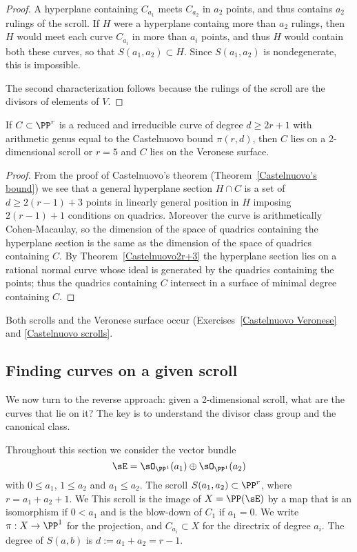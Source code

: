 \begin{proof}
A hyperplane containing $C_{a_1}$ meets $C_{a_2}$ in $a_2$
points, and thus contains $a_2$ rulings of the scroll. If $H$ were a hyperplane containg more than $a_2$
rulings, then $H$ would meet each curve $C_{a_i}$ in more than $a_i$ points, and thus $H$ would contain
both these curves, so that $S(a_1,a_2)\subset H$. Since $S(a_1,a_2)$ is nondegenerate, this is impossible.

The second characterization follows because the rulings of the scroll are the divisors of elements of $V.$
\end{proof}



\begin{theorem}\label{Castelnuovo examples}
If $C\subset \PP^r$ is a reduced and irreducible curve of degree $d\geq 2r+1$ with arithmetic genus equal to
the
Castelnuovo bound $\pi(r,d)$, then $C$ lies on a 2-dimensional scroll or $r=5$ and $C$ lies on  the Veronese surface.
\end{theorem}

\begin{proof}
From the proof of Castelnuovo's theorem (Theorem~\ref{Castelnuovo's bound}) we see that a general hyperplane
section $H\cap C$ is a set of $d\geq 2(r-1)+3$ points in linearly general position in $H$ imposing $2(r-1)+1$ conditions on quadrics. Moreover the curve
is arithmetically Cohen-Macaulay, so the dimension of the space of quadrics containing the hyperplane section
is the same as the dimension of the space of quadrics containing $C$. By Theorem~\ref{Castelnuovo2r+3} the hyperplane
section lies on a rational normal curve whose ideal is generated by the quadrics containing the points;
thus the quadrics containing $C$ intersect in a surface of minimal degree containing $C$.
\end{proof}

Both scrolls and the Veronese surface occur (Exercises~\ref{Castelnuovo Veronese} and \ref{Castelnuovo scrolls}.

\subsection{Finding curves on a given scroll}

We now turn to the reverse approach: given a 2-dimensional scroll, what are the curves that lie on it?
The key is to understand the divisor class group and the canonical class.

 Throughout this section we consider the vector bundle 
$$
\sE = \sO_{\PP^1}(a_1) \oplus\sO_{\PP^1}(a_2)
$$
with  $0\leq a_1$, $1\leq a_2$ and  $a_{1}\leq a_{2}$. The 
scroll $ S(a_1, a_2) \subset \PP^r$, where $r= a_1+a_2+1$. We  This scroll is the image of $X = \PP(\sE)$ by a map that is an isomorphism
if $0<a_1$ and is the blow-down of  $C_1$ if $a_1=0$.  We write $\pi:X \to \PP^1$ for the projection, and
$C_{a_i}\subset X$ for the directrix of degree $a_i$. The degree of $S(a,b)$ is $d := a_1+a_2 = r-1$.

